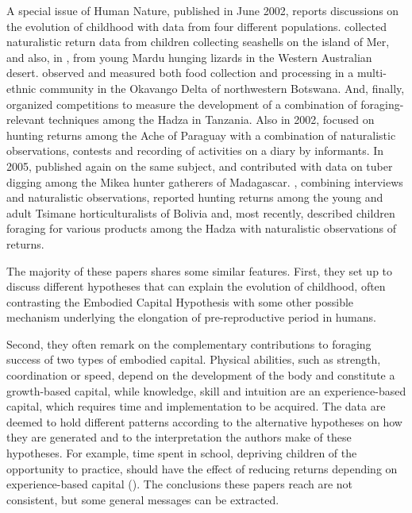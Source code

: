 A special issue of Human Nature, published in June 2002, reports discussions on the evolution of childhood with data from four different populations. \cite{bird_children_2002} collected naturalistic return data from children collecting seashells on the island of Mer, and also, in \cite{bird_constraints_2002}, from young Mardu hunging lizards in the Western Australian desert. \cite{bock_learning_2002} observed and measured both food collection and processing in a multi-ethnic community in the Okavango Delta of northwestern Botswana. And, finally, \cite{blurton_jones_selection_2002} organized competitions to measure the development of a combination of foraging-relevant techniques among the Hadza in Tanzania. 
Also in 2002, \cite{walker_age-dependency_2002} focused on hunting returns among the Ache of Paraguay with a combination of naturalistic observations, contests and recording of activities on a diary by informants. 
In 2005, \cite{bock_what_2005} published again on the same subject, and \cite{tucker_growing_2005} contributed with data on tuber digging among the Mikea hunter gatherers of Madagascar. 
\cite{gurven_how_2006}, combining interviews and naturalistic observations, reported hunting returns among the young and adult Tsimane horticulturalists of Bolivia and, most recently, \cite{crittenden_juvenile_2013} described children foraging for various products among the Hadza with naturalistic observations of returns.

The majority of these papers shares some similar features. 
First, they set up to discuss different hypotheses that can explain the evolution of childhood, often contrasting the Embodied Capital Hypothesis with some other possible mechanism underlying the elongation of pre-reproductive period in humans. 

Second, they often remark on the complementary contributions to foraging success of two types of embodied capital. Physical abilities, such as strength, coordination or speed, depend on the development of the body and constitute a growth-based capital, while knowledge, skill and intuition are an experience-based capital, which requires time and implementation to be acquired. 
The data are deemed to hold different patterns according to the alternative hypotheses on how they are generated and to the interpretation the authors make of these hypotheses. For example, time spent in school, depriving children of the opportunity to practice, should have the effect of reducing returns depending on experience-based capital (\cite{blurton_jones_selection_2002}).
The conclusions these papers reach are not consistent, but some general messages can be extracted. 

